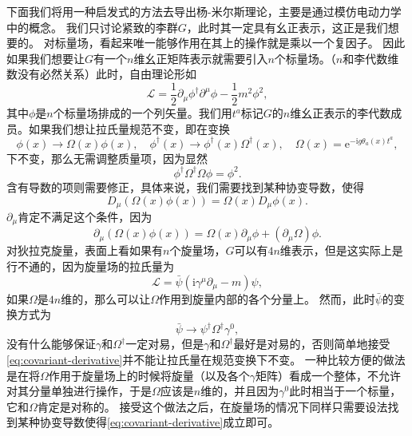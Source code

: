 \documentclass[hyperref, UTF8, a4paper]{ctexart}
\newcommand*{\ii}{\mathrm{i}}
\newcommand*{\ee}{\mathrm{e}}
\begin{document}
下面我们将用一种启发式的方法去导出杨-米尔斯理论，主要是通过模仿电动力学中的概念。
我们只讨论紧致的李群$G$，此时其一定具有幺正表示，这正是我们想要的。
对标量场，看起来唯一能够作用在其上的操作就是乘以一个复因子。
因此如果我们想要让$G$有一个$n$维幺正矩阵表示就需要引入$n$个标量场。（$n$和李代数维数没有必然关系）此时，自由理论形如
\[
    \mathcal{L} = \frac{1}{2} \partial_\mu \phi^\dagger \partial^\mu \phi - \frac{1}{2} m^2 \phi^2,
\]
其中$\phi$是$n$个标量场排成的一个列矢量。我们用$t^a$标记$G$的$n$维幺正表示的李代数成员。如果我们想让拉氏量规范不变，即在变换
\[
    \phi(x) \to \Omega(x) \phi(x), \quad \phi^\dagger(x) \to \phi^\dagger(x) \Omega^\dagger(x), \quad \Omega(x) = \ee^{- \ii g \theta_a(x) t^a},
\]
下不变，那么无需调整质量项，因为显然
\[
    \phi^\dagger \Omega^\dagger \Omega \phi = \phi^2.
\]
含有导数的项则需要修正，具体来说，我们需要找到某种协变导数，使得
\begin{equation}
    D_\mu (\Omega(x) \phi(x)) = \Omega(x) D_\mu \phi(x).
    \label{eq:covariant-derivative}
\end{equation}
$\partial_\mu$肯定不满足这个条件，因为
\[
    \partial_\mu (\Omega(x) \phi(x)) = \Omega(x) \partial_\mu \phi + (\partial_\mu \Omega) \phi.
\]
对狄拉克旋量，表面上看如果有$n$个旋量场，$G$可以有$4n$维表示，但是这实际上是行不通的，因为旋量场的拉氏量为
\[
    \mathcal{L} = \bar{\psi} (\ii \gamma^\mu \partial_\mu - m) \psi,
\]
如果$\Omega$是$4n$维的，那么可以让$\Omega$作用到旋量内部的各个分量上。
然而，此时$\bar{\psi}$的变换方式为
\[
    \bar{\psi} \to \psi^\dagger \Omega^\dagger \gamma^0,
\]
没有什么能够保证$\gamma$和$\Omega^\dagger$一定对易，但是$\gamma$和$\Omega^\dagger$最好是对易的，否则简单地接受\eqref{eq:covariant-derivative}并不能让拉氏量在规范变换下不变。
一种比较方便的做法是在将$\Omega$作用于旋量场上的时候将旋量（以及各个$\gamma$矩阵）看成一个整体，不允许对其分量单独进行操作，于是$\Omega$应该是$n$维的，并且因为$\gamma^0$此时相当于一个标量，它和$\Omega$肯定是对称的。
接受这个做法之后，在旋量场的情况下同样只需要设法找到某种协变导数使得\eqref{eq:covariant-derivative}成立即可。
\end{document}
